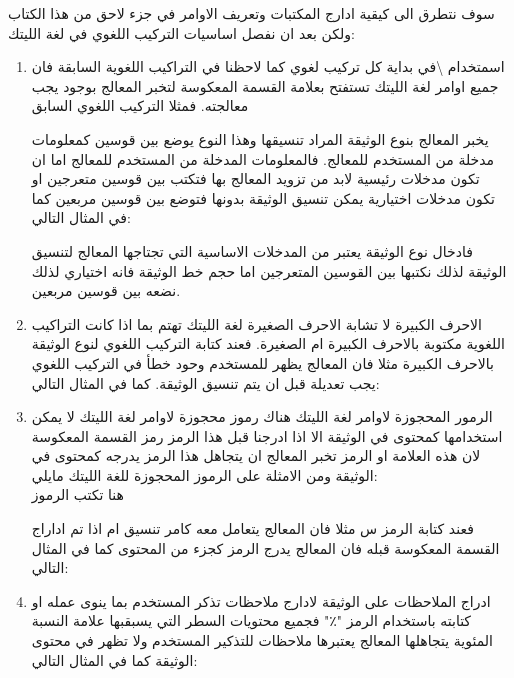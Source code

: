 سوف نتطرق الى كيقية ادارج المكتبات وتعريف الاوامر في جزء لاحق من هذا الكتاب ولكن بعد ان نفصل اساسيات التركيب اللغوي في لغة الليتك:
\begin{enumerate}
\item{اسمتخدام \textbackslash في بداية كل تركيب لغوي}
كما لاحظنا في التراكيب اللغوية السابقة فان جميع اوامر لغة الليتك تستفتح بعلامة القسمة المعكوسة لتخبر المعالج بوجود يجب معالجته. فمثلا التركيب اللغوي السابق 
\begin{mybox}

\end{mybox}
يخبر المعالج بنوع الوثيقة المراد تنسيقها وهذا النوع يوضع بين قوسين كمعلومات مدخلة من المستخدم للمعالج. فالمعلومات المدخلة من المستخدم للمعالج اما ان تكون مدخلات رئيسية لابد من تزويد المعالج بها فتكتب بين قوسين متعرجين او تكون مدخلات اختيارية يمكن تنسيق الوثيقة بدونها فتوضع بين قوسين مربعين كما في المثال التالي:
\begin{mybox}

\end{mybox}
فادخال نوع الوثيقة يعتبر من المدخلات الاساسية التي تجتاجها المعالج لتنسيق الوثيقة لذلك نكتبها بين القوسين المتعرجين اما حجم خط الوثيقة فانه اختياري لذلك نضعه بين قوسين مربعين.
\item{الاحرف الكبيرة لا تشابة الاحرف الصغيرة}
لغة الليتك تهتم بما اذا كانت التراكيب اللغوية مكتوبة بالاحرف الكبيرة ام الصغيرة. فعند كتابة التركيب اللغوي لنوع الوثيقة بالاحرف الكبيرة مثلا فان المعالج يظهر للمستخدم وحود خطأ في التركيب اللغوي يجب تعديلة قبل ان يتم تنسيق الوثيقة. كما في المثال التالي:

\item{الرمور المحجوزة لاوامر لغة الليتك}
هناك رموز محجوزة لاوامر لغة الليتك لا يمكن استخدامها كمحتوى في الوثيقة الا اذا ادرجنا قبل هذا الرمز رمز القسمة المعكوسة لان هذه العلامة او الرمز تخبر المعالج ان يتجاهل هذا الرمز يدرجه كمحتوى في الوثيقة ومن الامثلة على الرموز المحجوزة للغة الليتك مايلي:
\\ هنا تكتب الرموز

فعند كتابة الرمز س مثلا فان المعالج يتعامل معه كامر تنسيق ام اذا تم اداراج القسمة المعكوسة قبله فان المعالج يدرج الرمز كجزء من المحتوى كما في المثال التالي:
\begin{mybox}

\end{mybox}
\item{ادراج الملاحظات على الوثيقة}
لادارج ملاحظات تذكر المستخدم بما ينوى عمله او كتابته باستخدام الرمز "٪" فجميع محتويات السطر التي يسبقبها علامة النسبة المئوية يتجاهلها المعالج يعتبرها ملاحظات للتذكير المستخدم ولا تظهر في محتوى الوثيقة كما في المثال التالي:
\begin{mybox}


\end{mybox}
\end{enumerate}
